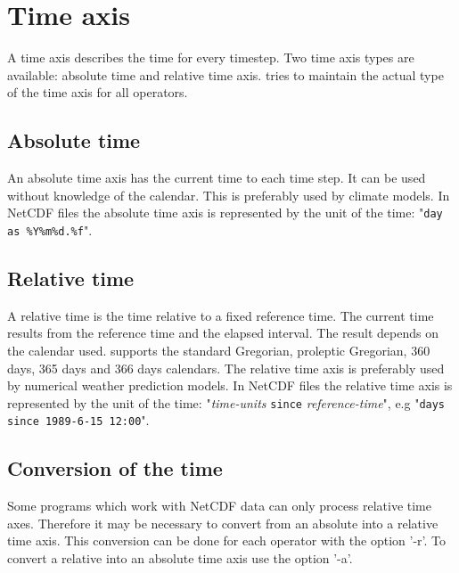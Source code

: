 \section{Time axis}

A time axis describes the time for every timestep.
Two time axis types are available: absolute time and relative time axis.
{\CDO} tries to maintain the actual type of the time axis for all operators.

\subsection{Absolute time}

An absolute time axis has the current time to each time step.
It can be used without knowledge of the calendar.
This is preferably used by climate models.
In NetCDF files the absolute time axis is represented by the 
unit of the time: {"\texttt{day as \%Y\%m\%d.\%f}"}.

\subsection{Relative time}

A relative time is the time relative to a fixed reference time.
The current time results from the reference time and the elapsed interval.
The result depends on the calendar used.
{\CDO} supports the standard Gregorian, proleptic Gregorian, 360 days, 365 days and 366 days calendars.
The relative time axis is preferably used by numerical weather prediction models.
In NetCDF files the relative time axis is represented by the 
unit of the time: {"\textit{time-units} \texttt{since} \textit{reference-time}"},
e.g "\texttt{days since 1989-6-15 12:00}".

\subsection{Conversion of the time}

Some programs which work with NetCDF data can only process relative time axes.
Therefore it may be necessary to convert from an absolute into a relative time axis.
This conversion can be done for each operator with the {\CDO} option '-r'.
To convert a relative into an absolute time axis use the {\CDO} option '-a'.
